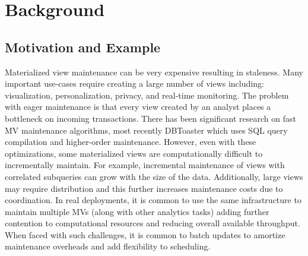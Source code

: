 \section{Background}\label{sec-background}

\subsection{Motivation and Example}\label{subsec-inc}
Materialized view maintenance can be very expensive resulting in staleness. 
Many important use-cases require creating a large number of views including: visualization, personalization, privacy, and real-time monitoring.  
The problem with eager maintenance is that every view created by an analyst places a bottleneck on incoming transactions.
There has been significant research on fast MV maintenance algorithms, most recently DBToaster \cite{DBLP:journals/vldb/KochAKNNLS14} which uses SQL query compilation and higher-order maintenance.
However, even with these optimizations, some materialized views are computationally difficult to incrementally maintain.
For example, incremental maintenance of views with correlated subqueries can grow with the size of the data.
Additionally, large views may require distribution and this further increases maintenance costs due to coordination.
In real deployments, it is common to use the same infrastructure to maintain multiple MVs (along with other analytics tasks) adding further contention to computational resources and reducing overall available throughput. 
When faced with such challenges, it is common to batch updates to amortize maintenance overheads and add flexibility to scheduling.

